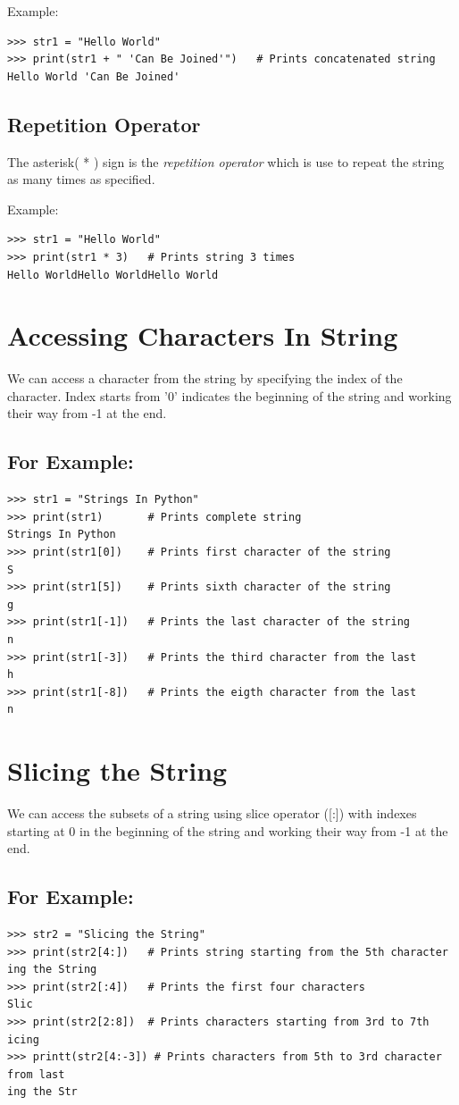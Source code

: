 \documentclass[11pt,a4paper]{article}
\begin{document}
Example:
\begin{verbatim}
>>> str1 = "Hello World"
>>> print(str1 + " 'Can Be Joined'")   # Prints concatenated string 
Hello World 'Can Be Joined'
\end{verbatim}

\subsection*{Repetition Operator}

The asterisk( * ) sign is the \emph{repetition operator} which is use to repeat the string as many times as specified.

Example:
\begin{verbatim}
>>> str1 = "Hello World"
>>> print(str1 * 3)   # Prints string 3 times
Hello WorldHello WorldHello World
\end{verbatim}

\section*{Accessing Characters In String}
We can access a character from the string by specifying the index of the character. Index starts from '0' indicates the beginning of the string and working their way from -1 at the end.

\subsection*{For Example:}
\begin{verbatim}
>>> str1 = "Strings In Python"
>>> print(str1)       # Prints complete string
Strings In Python
>>> print(str1[0])    # Prints first character of the string
S
>>> print(str1[5])    # Prints sixth character of the string
g
>>> print(str1[-1])   # Prints the last character of the string
n
>>> print(str1[-3])   # Prints the third character from the last
h
>>> print(str1[-8])   # Prints the eigth character from the last
n
\end{verbatim}

\section*{Slicing the String}

We can access the subsets of a string using slice operator ([:]) with indexes starting at 0 in the beginning of the string and working their way from -1 at the end.

\subsection*{For Example: }
\begin{verbatim}
>>> str2 = "Slicing the String"
>>> print(str2[4:])   # Prints string starting from the 5th character
ing the String
>>> print(str2[:4])   # Prints the first four characters
Slic
>>> print(str2[2:8])  # Prints characters starting from 3rd to 7th
icing
>>> printt(str2[4:-3]) # Prints characters from 5th to 3rd character from last
ing the Str
\end{verbatim}
\end{document}
